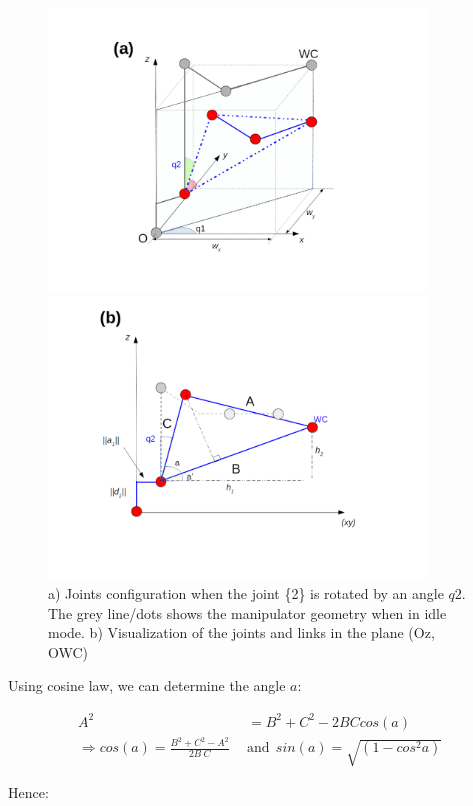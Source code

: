 \documentclass[a4paper,12pt]{report}
\begin{document}
\begin{figure}[H]
\label{fig:figq2}
\begin{multicols}{2}
    \includegraphics[width=10cm]{imgs/q2_1.png}\par 
    \includegraphics[width=10cm]{imgs/q2_2.png}\par 
\end{multicols}
\caption{a) Joints configuration when the joint \{2\} is rotated by an angle $q2$. The grey line/dots shows the manipulator geometry when in idle mode. b) Visualization of the joints and links in the plane (Oz, OWC)}

\end{figure}

Using cosine law, we can determine the angle $a$:

\begin{align}
A^2 &= B^2 + C^2 - 2BC cos(a)  \\
\Rightarrow cos(a) = \frac{B^2 + C^2 - A^2}{2 B \ C} \ \ &\text{and} \  \ sin(a) = \sqrt{(1- cos^2 a)}
\end{align}

Hence:
\end{document}
